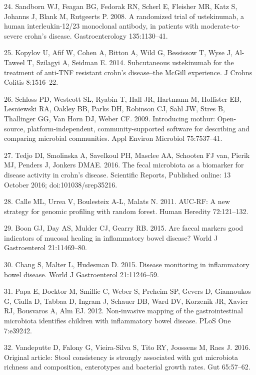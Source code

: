 \documentclass[11pt,]{article}
\begin{document}
\hypertarget{ref-sandborn_ust_2008}{}
24. Sandborn WJ, Feagan BG, Fedorak RN, Scherl E, Fleisher MR, Katz S,
Johanns J, Blank M, Rutgeerts P. 2008. A randomized trial of
ustekinumab, a human interleukin-12/23 monoclonal antibody, in patients
with moderate-to-severe crohn's disease. Gastroenterology 135:1130--41.

\hypertarget{ref-kopylov_ust_2014}{}
25. Kopylov U, Afif W, Cohen A, Bitton A, Wild G, Bessissow T, Wyse J,
Al-Taweel T, Szilagyi A, Seidman E. 2014. Subcutaneous ustekinumab for
the treatment of anti-TNF resistant crohn's disease--the McGill
experience. J Crohns Colitis 8:1516--22.

\hypertarget{ref-schloss_mothur_2009}{}
26. Schloss PD, Westcott SL, Ryabin T, Hall JR, Hartmann M, Hollister
EB, Lesniewski RA, Oakley BB, Parks DH, Robinson CJ, Sahl JW, Stres B,
Thallinger GG, Van Horn DJ, Weber CF. 2009. Introducing mothur:
Open-source, platform-independent, community-supported software for
describing and comparing microbial communities. Appl Environ Microbiol
75:7537--41.

\hypertarget{ref-tedjo_CDactivity_2016}{}
27. Tedjo DI, Smolinska A, Savelkoul PH, Masclee AA, Schooten FJ van,
Pierik MJ, Penders J, Jonkers DMAE. 2016. The fecal microbiota as a
biomarker for disease activity in crohn's disease. Scientific Reports,
Published online: 13 October 2016; doi:101038/srep35216.

\hypertarget{ref-calle_aucrf_2011}{}
28. Calle ML, Urrea V, Boulesteix A-L, Malats N. 2011. AUC-RF: A new
strategy for genomic profiling with random forest. Human Heredity
72:121--132.

\hypertarget{ref-boon_fmarkers_2015}{}
29. Boon GJ, Day AS, Mulder CJ, Gearry RB. 2015. Are faecal markers good
indicators of mucosal healing in inflammatory bowel disease? World J
Gastroenterol 21:11469--80.

\hypertarget{ref-chang_monitoring_2015}{}
30. Chang S, Malter L, Hudesman D. 2015. Disease monitoring in
inflammatory bowel disease. World J Gastroenterol 21:11246--59.

\hypertarget{ref-papa_pedsIBD_2012}{}
31. Papa E, Docktor M, Smillie C, Weber S, Preheim SP, Gevers D,
Giannoukos G, Ciulla D, Tabbaa D, Ingram J, Schauer DB, Ward DV,
Korzenik JR, Xavier RJ, Bousvaros A, Alm EJ. 2012. Non-invasive mapping
of the gastrointestinal microbiota identifies children with inflammatory
bowel disease. PLoS One 7:e39242.

\hypertarget{ref-vandeputte_stoolcon_2016}{}
32. Vandeputte D, Falony G, Vieira-Silva S, Tito RY, Joossens M, Raes J.
2016. Original article: Stool consistency is strongly associated with
gut microbiota richness and composition, enterotypes and bacterial
growth rates. Gut 65:57--62.
\end{document}

